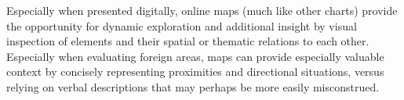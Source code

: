 Especially when presented digitally, online maps (much like other charts) provide the opportunity for dynamic exploration and additional insight by visual inspection of elements and their spatial or thematic relations to each other. Especially when evaluating foreign areas, maps can provide especially valuable context by concisely representing proximities and directional situations, versus relying on verbal descriptions that may perhaps be more easily misconstrued\cite{Shneiderman1996}. %

